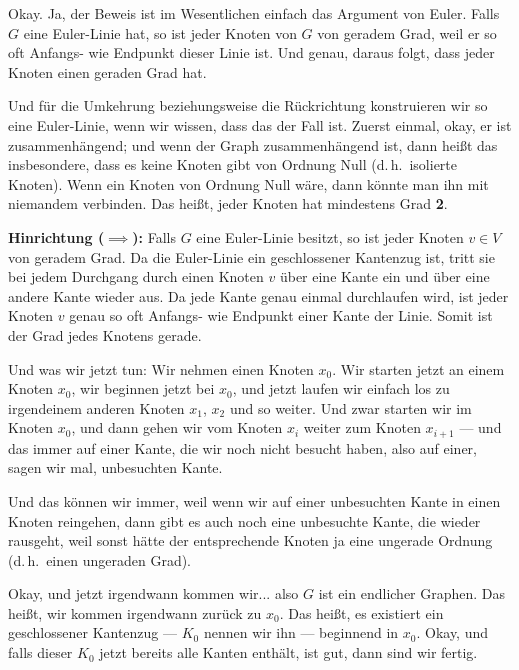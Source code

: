 \begin{spoken-clean}[00:06:20 - 00:08:30]
Okay. Ja, der Beweis ist im Wesentlichen einfach das Argument von Euler. Falls $G$ eine Euler-Linie hat, so ist jeder Knoten von $G$ von geradem Grad, weil er so oft Anfangs- wie Endpunkt dieser Linie ist.  Und genau, daraus folgt, dass jeder Knoten einen geraden Grad hat.

Und für die Umkehrung beziehungsweise die Rückrichtung konstruieren wir so eine Euler-Linie, wenn wir wissen, dass das der Fall ist. Zuerst einmal, okay, er ist zusammenhängend; und wenn der Graph zusammenhängend ist, dann heißt das insbesondere, dass es keine Knoten gibt von Ordnung Null (d.\,h.\ isolierte Knoten). Wenn ein Knoten von Ordnung Null wäre, dann könnte man ihn mit niemandem verbinden. Das heißt, jeder Knoten hat mindestens Grad \textbf{2}. 
\end{spoken-clean}

\begin{math-stroke}
\begin{short-proof}
\textbf{Hinrichtung ($\implies$):}
Falls $G$ eine Euler-Linie besitzt, so ist jeder Knoten $v \in V$ von geradem Grad. Da die Euler-Linie ein geschlossener Kantenzug ist, tritt sie bei jedem Durchgang durch einen Knoten $v$ über eine Kante ein und über eine andere Kante wieder aus. Da jede Kante genau einmal durchlaufen wird, ist jeder Knoten $v$ genau so oft Anfangs- wie Endpunkt einer Kante der Linie. Somit ist der Grad jedes Knotens gerade.
\end{short-proof}
\end{math-stroke}

\begin{spoken-clean}[00:08:30 - 00:11:00]
Und was wir jetzt tun: Wir nehmen einen Knoten $x_0$. Wir starten jetzt an einem Knoten $x_0$, wir beginnen jetzt bei $x_0$, und jetzt laufen wir einfach los zu irgendeinem anderen Knoten $x_1$, $x_2$ und so weiter. Und zwar starten wir im Knoten $x_0$, und dann gehen wir vom Knoten $x_i$ weiter zum Knoten $x_{i+1}$ --- und das immer auf einer Kante, die wir noch nicht besucht haben, also auf einer, sagen wir mal, unbesuchten Kante. 

Und das können wir immer, weil wenn wir auf einer unbesuchten Kante in einen Knoten reingehen, dann gibt es auch noch eine unbesuchte Kante, die wieder rausgeht, weil sonst hätte der entsprechende Knoten ja eine ungerade Ordnung (d.\,h.\ einen ungeraden Grad).

Okay, und jetzt irgendwann kommen wir... also $G$ ist ein endlicher Graphen. Das heißt, wir kommen irgendwann zurück zu $x_0$.  Das heißt, es existiert ein geschlossener Kantenzug --- $K_0$ nennen wir ihn --- beginnend in $x_0$. Okay, und falls dieser $K_0$ jetzt bereits alle Kanten enthält, ist gut, dann sind wir fertig.
\end{spoken-clean}

